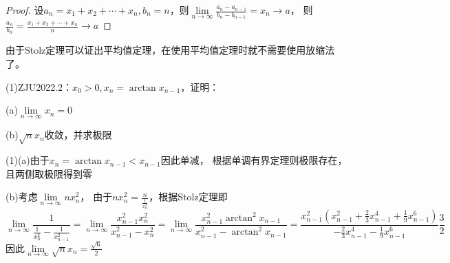 \begin{proof}
  设$a_n = x_1 + x_2 + \cdots + x_n, b_n = n$，则$\lim \limits _{n \rightarrow \infty} \frac{a_n - a_{n-1}}{b_n - b_{n-1}} = x_n \rightarrow a$，
  则$\frac{a_n}{b_n} = \frac{x_1 + x_2 + \cdots + x_n}{n} \rightarrow a$
\end{proof}

\begin{note}
  由于Stolz定理可以证出平均值定理，在使用平均值定理时就不需要使用放缩法了。
\end{note}

\begin{exercise}[几道经典题目]
  (1)ZJU2022.2：$x_0 > 0, x_n= \arctan x_{n-1}$，证明：

  (a)$\lim \limits _{n \rightarrow \infty} x_n = 0$

  (b)$\sqrt{n}x_n$收敛，并求极限
\end{exercise}

\begin{solution}
  (1)(a)由于$x_n = \arctan x_{n-1} < x_{n-1}$因此单减，
  根据单调有界定理则极限存在，且两侧取极限得到零

  (b)考虑$\lim \limits _{n \rightarrow \infty} nx_n^2$，
  由于$nx_n^2 = \frac{n}{\frac{1}{x_n^2}}$，根据Stolz定理即
  \begin{equation*}
    \lim \limits _{n \rightarrow \infty} \frac{1}{\frac{1}{x_n^2} - \frac{1}{x_{n-1}^2}} = \lim \limits _{n \rightarrow \infty} \frac{x_{n-1}^2 x_n^2}{x_{n-1}^2 - x_n^2} = \lim \limits _{n \rightarrow \infty} \frac{x_{n-1}^2 \arctan^2 x_{n-1}}{x_{n-1}^2 - \arctan^2 x_{n-1}} = \frac{x_{n-1}^2(x_{n-1}^2 + \frac{2}{3}x_{n-1}^4 + \frac{1}{9}x_{n-1}^6)}{- \frac{2}{3} x_{n-1}^4 - \frac{1}{9}x_{n-1}^6} \frac{3}{2}
  \end{equation*}
  因此$\lim \limits _{n \rightarrow \infty} \sqrt{n}x_n = \frac{\sqrt{6}}{2}$
\end{solution}






